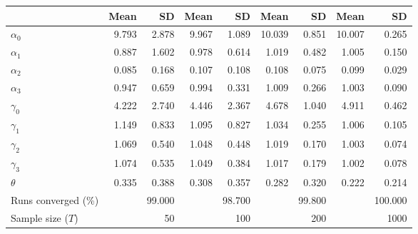 
\begin{tabular}[t]{lrrrrrrrr}
\toprule
  & Mean & SD & Mean  & SD  & Mean   & SD   & Mean    & SD   \\
\midrule
$\alpha_{0}$ & 9.793 & 2.878 & 9.967 & 1.089 & 10.039 & 0.851 & 10.007 & 0.265\\
$\alpha_{1}$ & 0.887 & 1.602 & 0.978 & 0.614 & 1.019 & 0.482 & 1.005 & 0.150\\
$\alpha_{2}$ & 0.085 & 0.168 & 0.107 & 0.108 & 0.108 & 0.075 & 0.099 & 0.029\\
$\alpha_{3}$ & 0.947 & 0.659 & 0.994 & 0.331 & 1.009 & 0.266 & 1.003 & 0.090\\
$\gamma_{0}$ & 4.222 & 2.740 & 4.446 & 2.367 & 4.678 & 1.040 & 4.911 & 0.462\\
$\gamma_{1}$ & 1.149 & 0.833 & 1.095 & 0.827 & 1.034 & 0.255 & 1.006 & 0.105\\
$\gamma_{2}$ & 1.069 & 0.540 & 1.048 & 0.448 & 1.019 & 0.170 & 1.003 & 0.074\\
$\gamma_{3}$ & 1.074 & 0.535 & 1.049 & 0.384 & 1.017 & 0.179 & 1.002 & 0.078\\
$\theta$ & 0.335 & 0.388 & 0.308 & 0.357 & 0.282 & 0.320 & 0.222 & 0.214\\
Runs converged (\%) &  & 99.000 &  & 98.700 &  & 99.800 &  & 100.000\\
Sample size ($T$) &  & 50 &  & 100 &  & 200 &  & 1000\\
\bottomrule
\end{tabular}
